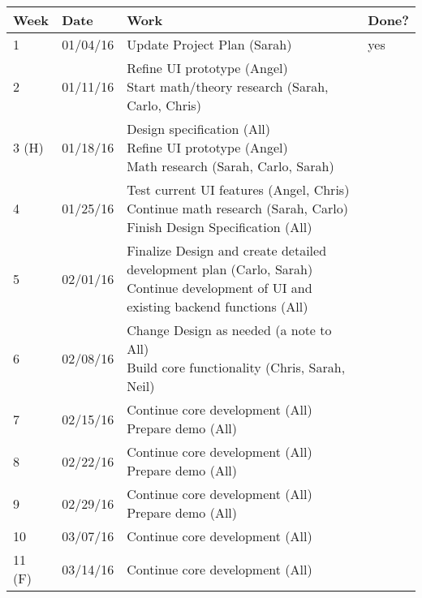 \begin{table}[H]
\centering
\begin{tabular}{|l|l|l|l|}
\hline
Week 	& Date	 		& Work	 		& 	Done?	 \\ \hline
1		& 01/04/16	 	& Update Project Plan (Sarah)		& 	yes	 \\ \hline
2		& 01/11/16	 	& \specialcell{Refine UI prototype (Angel)  \\ Start math/theory research (Sarah, Carlo, Chris)}		& 			 \\ \hline
3 (H)	& 01/18/16	 	& \specialcell{Design specification (All) \\ Refine UI prototype (Angel) \\ Math research (Sarah, Carlo, Sarah)}		& 			 \\ \hline
4		& 01/25/16	 	& \specialcell{Test current UI features (Angel, Chris) \\ Continue math research (Sarah, Carlo) \\ Finish Design Specification (All)}		& 			 \\ \hline
5		& 02/01/16	 	& \specialcell{Finalize Design and create detailed development plan (Carlo, Sarah) \\ Continue development of UI and existing backend functions (All)}	& 			 \\ \hline
6		& 02/08/16	 	& \specialcell{Change Design as needed (a note to All) \\ Build core functionality (Chris, Sarah, Neil)}		& 			 \\ \hline
7		& 02/15/16	 	& \specialcell{Continue core development (All) \\ Prepare demo (All)}		& 			 \\ \hline
8		& 02/22/16	 	& \specialcell{Continue core development (All) \\ Prepare demo (All)}	& 			 \\ \hline
9		& 02/29/16	 	& \specialcell{Continue core development (All) \\ Prepare demo (All)}	& 			 \\ \hline
10		& 03/07/16	 	& Continue core development (All)		& 			 \\ \hline
11 (F)	& 03/14/16	 	& Continue core development (All)			& 			 \\ \hline
\end{tabular}
\end{table}

